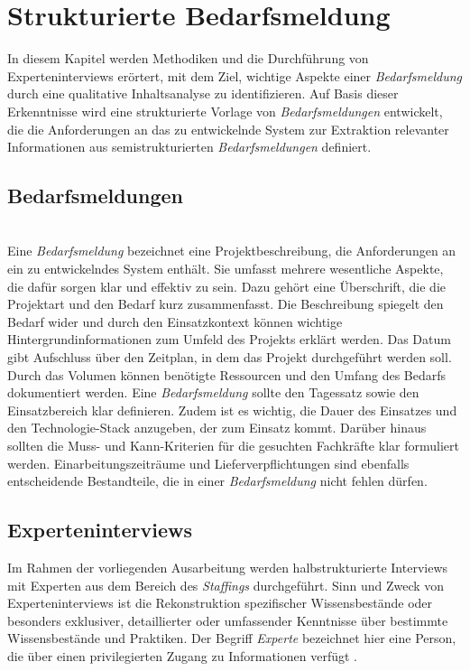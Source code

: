 \chapter{Strukturierte Bedarfsmeldung}
\label{chap:erwartungshaltung}
In diesem Kapitel werden Methodiken und die Durchführung von Experteninterviews erörtert, mit dem Ziel, wichtige Aspekte einer \emph{Bedarfsmeldung} durch eine qualitative Inhaltsanalyse zu identifizieren. Auf Basis dieser Erkenntnisse wird eine strukturierte Vorlage von \emph{Bedarfsmeldungen} entwickelt, die die Anforderungen an das zu entwickelnde System zur Extraktion relevanter Informationen aus semistrukturierten \emph{Bedarfsmeldungen} definiert.
\section{Bedarfsmeldungen}\mbox{} \\
Eine \emph{Bedarfsmeldung} bezeichnet eine Projektbeschreibung, die Anforderungen an ein zu entwickelndes System enthält. Sie umfasst mehrere wesentliche Aspekte, die dafür sorgen klar und effektiv zu sein. Dazu gehört eine Überschrift, die die Projektart und den Bedarf kurz zusammenfasst. Die Beschreibung spiegelt den Bedarf wider und durch den Einsatzkontext können wichtige Hintergrundinformationen zum Umfeld des Projekts erklärt werden. Das Datum gibt Aufschluss über den Zeitplan, in dem das Projekt durchgeführt werden soll. Durch das Volumen können benötigte Ressourcen und den Umfang des Bedarfs dokumentiert werden. Eine \emph{Bedarfsmeldung} sollte den Tagessatz sowie den Einsatzbereich klar definieren. Zudem ist es wichtig, die Dauer des Einsatzes und den Technologie-Stack anzugeben, der zum Einsatz kommt. Darüber hinaus sollten die Muss- und Kann-Kriterien für die gesuchten Fachkräfte klar formuliert werden. Einarbeitungszeiträume und Lieferverpflichtungen sind ebenfalls entscheidende Bestandteile, die in einer \emph{Bedarfsmeldung} nicht fehlen dürfen.\\
\section{Experteninterviews}
\label{sec:beschreibung-der-interviews}
Im Rahmen der vorliegenden Ausarbeitung werden halbstrukturierte Interviews mit Experten aus dem Bereich des \emph{Staffings} durchgeführt. Sinn und Zweck von Experteninterviews ist die Rekonstruktion spezifischer Wissensbestände oder besonders exklusiver, detaillierter oder umfassender Kenntnisse über bestimmte Wissensbestände und Praktiken. Der Begriff \emph{Experte} bezeichnet hier eine Person, die über einen privilegierten Zugang zu Informationen verfügt \cite{pfadenhauer2009eye}.\\ 

